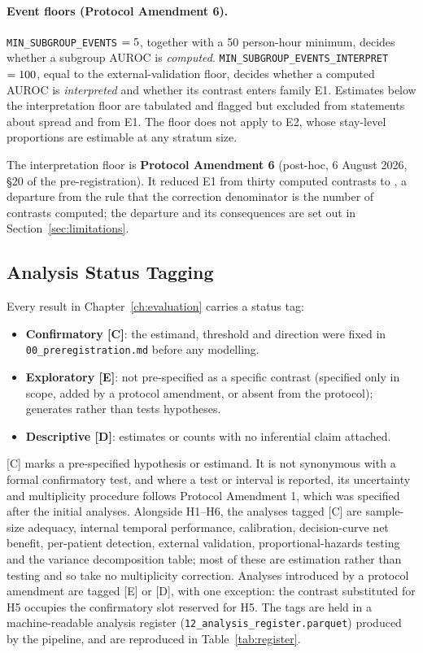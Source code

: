 \paragraph{Event floors (Protocol Amendment 6).}
\texttt{MIN\_SUBGROUP\_EVENTS} $= 5$, together with
a 50 person-hour minimum, decides whether a subgroup AUROC is
\emph{computed}. \texttt{MIN\_SUBGROUP\_EVENTS\_INTERPRET}
$= 100$, equal to the external-validation floor, decides
whether a computed AUROC is \emph{interpreted} and whether its contrast enters
family E1. Estimates below the interpretation floor are tabulated and flagged
but excluded from statements about spread and from E1. The floor does not
apply to E2, whose stay-level proportions are estimable at any stratum size.

The interpretation floor is \textbf{Protocol Amendment 6} (post-hoc,
6 August 2026, \S20 of the pre-registration). It reduced E1 from thirty
computed contrasts to \pcNSubgroupContrasts{}, a departure from the rule that
the correction denominator is the number of contrasts computed; the departure
and its consequences are set out in Section~\ref{sec:limitations}.

\subsection{Analysis Status Tagging}

Every result in Chapter~\ref{ch:evaluation} carries a status tag:

\begin{itemize}
    \item \textbf{Confirmatory [C]}: the estimand, threshold and direction were
          fixed in \texttt{00\_preregistration.md} before any modelling.
    \item \textbf{Exploratory [E]}: not pre-specified as a specific contrast
          (specified only in scope, added by a protocol amendment, or absent
          from the protocol); generates rather than tests hypotheses.
    \item \textbf{Descriptive [D]}: estimates or counts with no inferential
          claim attached.
\end{itemize}

[C] marks a pre-specified hypothesis or estimand. It is not synonymous with a
formal confirmatory test, and where a test or interval is reported, its
uncertainty and multiplicity procedure follows Protocol Amendment 1, which was
specified after the initial analyses. Alongside H1--H6, the analyses tagged
[C] are sample-size adequacy, internal temporal performance, calibration,
decision-curve net benefit, per-patient detection, external validation,
proportional-hazards testing and the variance decomposition table; most of
these are estimation rather than testing and so take no multiplicity
correction. Analyses introduced by a protocol amendment are tagged [E] or [D],
with one exception: the contrast substituted for H5 occupies the confirmatory
slot reserved for H5. The tags are held in a machine-readable analysis register
(\texttt{12\_analysis\_\allowbreak register\allowbreak .parquet}) produced by
the pipeline, and are reproduced in Table~\ref{tab:register}.

